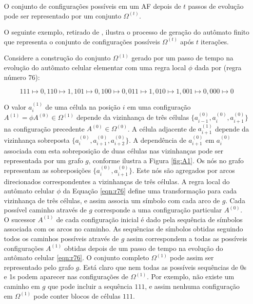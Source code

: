 \documentclass[12pt,a4paper]{article}
\begin{document}
O conjunto de configurações possíveis em um AF depois de $t$
passos de evolução pode ser representado por um conjunto $\Omega^{(t)}$.

O seguinte exemplo, retirado de , ilustra o processo de
geração do autômato finito que representa o conjunto de configurações
possíveis $\Omega^{(t)}$ após $t$ iterações.

Considere a construção do conjunto $\Omega^{(1)}$ gerado por um passo de
tempo na evolução do autômato celular elementar com uma regra
local $\phi$ dada por (regra número 76):

\begin{equation}\label{eqn:r76}
111 \mapsto 0, 110 \mapsto 1, 101 \mapsto 0, 100 \mapsto 0, 011 \mapsto 1, 010 \mapsto 1,
001 \mapsto 0, 000 \mapsto 0
\end{equation}

O valor $a_i^{(1)}$ de uma célula na posição $i$ em uma configuração
$A^{(1)} = \phi A^{(0)} \in \Omega^{(1)}$ depende da vizinhança de três
células $\{a_{i-1}^{(0)},a_i^{(0)},a_{i+1}^{(0)}\}$ na configuração precedente
$A^{(0)} \in \Omega^{(0)}$. A célula adjacente de $a_{i+1}^{(1)}$ depende da
vizinhança sobreposta $\{a_i^{(0)},a_{i+1}^{(0)},a_{i+2}^{(0)}\}$. A
dependência de $a_{i+1}^{(0)}$ em $a_i^{(0)}$ associada com esta sobreposição
de duas células nas vizinhanças pode ser representada por um grafo $g$, conforme
ilustra a Figura \ref{fig:A1}. Os nós no grafo representam as sobreposições
$\{a_i^{(0)},a_{i+1}^{(0)}\}$. Este nós são agregados por arcos direcionados
correspondentes a vizinhanças de três células. A regra local do autômato
celular $\phi$ da Equação \ref{eqn:r76} define uma transformação para cada
vizinhança de três células, e assim associa um símbolo com cada arco de $g$.
Cada possível caminho através de $g$ corresponde a uma configuração particular
$A^{(0)}$. O sucessor $A^{(1)}$ de cada configuração inicial é dado pela
sequência de símbolos associada com os arcos no caminho. As sequências de
símbolos obtidas seguindo todos os caminhos possíveis através de $g$ assim
correspondem a todas as possíveis configurações $A^{(1)}$ obtidas depois
de um passo de tempo na evolução do autômato celular \ref{eqn:r76}. O
conjunto completo $\Omega^{(1)}$ pode assim ser representado pelo grafo
$g$. Está claro que nem todas as possíveis sequências de 0s e 1s podem
aparecer nas configurações de $\Omega^{(1)}$. Por exemplo, não existe um
caminho em $g$ que pode incluir a sequência $111$, e assim nenhuma
configuração em $\Omega^{(1)}$ pode conter blocos de células $111$.
\end{document}
